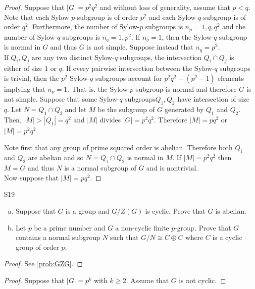 \documentclass[../AlgebraQualSolutions.tex]{subfiles}
\begin{document}
\begin{proof}
Suppose that $|G| = p^2q^2$ and without loss of generality, assume that $p < q$. Note that each Sylow $p$-subgroup is of order $p^2$ and each Sylow $q$-subgroup is of order $q^2$. Furthermore, the number of Sylow-$p$ subgroups is $n_p = 1, q, q^2$ and the number of Sylow-$q$ subgroups is $n_q = 1, p^2$. If $n_q = 1$, then the Sylow-$q$ subgroup is normal in $G$ and thus $G$ is not simple. Suppose instead that $n_q = p^2$.\\

If $Q_i, Q_j$ are any two distinct Sylow-$q$ subgroups, the intersection $Q_i \cap Q_j$ is either of size $1$ or $q$. If every pairwise intersection between the Sylow-$q$ subgroups is trivial, then the $p^2$ Sylow-$q$ subgroups account for $p^2q^2 - (p^2 -1)$ elements implying that $n_p = 1$. That is, the Sylow-$p$ subgroup is normal and therefore $G$ is not simple. Suppose that some Sylow-$q$ subgroups$Q_1, Q_2$ have intersection of size $q$. Let $N = Q_1 \cap Q_2$ and let $M$ be the subgroup of $G$ generated by $Q_1$ and $Q_2$. Then, $|M| > |Q_1| = q^2$ and $|M|$ divides $|G| = p^2q^2$. Therefore $|M| = pq^2$ or $|M| = p^2 q^2$. 

Note first that any group of prime squared order is abelian. Therefore both $Q_1$ and $Q_2$ are abelian and so $N = Q_1 \cap Q_2$ is normal in $M$. If $|M| = p^2q^2$ then $M=G$ and thus $N$ is a normal subgroup of $G$ and is nontrivial.\\

Now suppose that $|M| = pq^2$. 
\end{proof}

\begin{prob}{S19}{}
\begin{enumerate}[(a)]
\item Suppose that $G$ is a group and $G/Z(G)$ is cyclic. Prove  that $G$ is abelian.
\item Let $p$ be a prime number and $G$ a non-cyclic finite $p$-group. Prove that $G$ contains a normal subgroup $N$ such that $G/N \cong C \oplus C$ where $C$ is a cyclic group of order $p$.
\end{enumerate}
\end{prob}

\begin{proof}
See \ref{prob:GZG}.
\end{proof}

\begin{proof}
Suppose that $|G| = p^k$ with $k \geq 2$. Assume that $G$ is not cyclic.
\end{proof}
\end{document}
